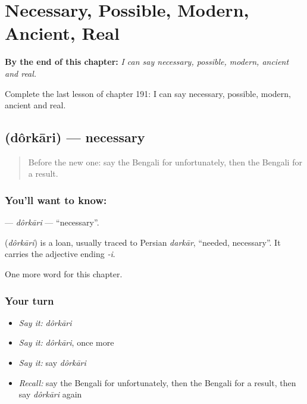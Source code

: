 
\chapter{Necessary, Possible, Modern, Ancient, Real}
\label{ch:bn-necessary-possible-modern-ancient-real}

\begin{chapteropening}
\textbf{By the end of this chapter:} \emph{I can say necessary, possible, modern, ancient and real.}

Complete the last lesson of chapter 191: I can say necessary, possible, modern, ancient and real.
\end{chapteropening}

\section[\texorpdfstring{\bn{দরকারি} (dôrkāri)}{দরকারি (dôrkāri)}]{ (dôrkāri) — necessary}

\label{lesson:BN-C191-dorkari}



\begin{quote}
Before the new one: say the Bengali for unfortunately, then the Bengali for a result.
\end{quote}

\subsection*{You'll want to know: }
\textbf{} — \emph{dôrkāri} — \textquotedblleft{}necessary\textquotedblright{}.

\begin{cousinweb}
\textbf{} (\emph{dôrkāri}) is a loan, usually traced to Persian \emph{darkār}, \textquotedblleft{}needed, necessary\textquotedblright{}. It carries the adjective ending \emph{-i}.
\end{cousinweb}

\begin{grammarlens}[title={What you've built}]
One more word for this chapter.
\end{grammarlens}

\subsection*{Your turn}
\begin{itemize}
\raggedright
  \item \emph{Say it:} \emph{dôrkāri}
  \item \emph{Say it:} \emph{dôrkāri}, once more
  \item \emph{Say it:} say \emph{dôrkāri}
  \item \emph{Recall:} say the Bengali for unfortunately, then the Bengali for a result, then say \emph{dôrkāri} again
\end{itemize}

